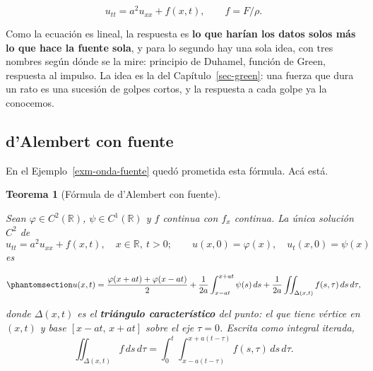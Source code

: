 \documentclass[
  spanish,
  a4paper,
]{scrbook}
\theoremstyle{definition}
\theoremstyle{plain}
\theoremstyle{definition}
\theoremstyle{plain}
\newtheorem{theorem}{Teorema}[chapter]
\theoremstyle{definition}
\theoremstyle{remark}
\begin{document}
\[
u_{tt} = a^2u_{xx} + f(x,t), \qquad f = F/\rho .
\]

Como la ecuación es lineal, la respuesta es \textbf{lo que harían los
datos solos más lo que hace la fuente sola}, y para lo segundo hay una
sola idea, con tres nombres según dónde se la mire: principio de
Duhamel, función de Green, respuesta al impulso. La idea es la del
Capítulo~\ref{sec-green}: una fuerza que dura un rato es una sucesión de
golpes cortos, y la respuesta a cada golpe ya la conocemos.

\subsection{d'Alembert con fuente}\label{sec-hip-duhamel}

En el Ejemplo~\ref{exm-onda-fuente} quedó prometida esta fórmula. Acá
está.

\begin{theorem}[Fórmula de d'Alembert con
fuente]\protect\hypertarget{thm-hip-dalembert-fuente}{}\label{thm-hip-dalembert-fuente}

Sean \(\varphi\in C^2(\mathbb R)\), \(\psi\in C^1(\mathbb R)\) y \(f\)
continua con \(f_x\) continua. La única solución \(C^2\) de
\[u_{tt} = a^2u_{xx} + f(x,t),\quad x\in\mathbb R,\ t>0;\qquad u(x,0)=\varphi(x),\quad u_t(x,0)=\psi(x)\]
es

\begin{equation}\protect\phantomsection\label{eq-hip-dalembert-fuente}{
u(x,t) = \frac{\varphi(x+at)+\varphi(x-at)}{2} + \frac{1}{2a}\int_{x-at}^{x+at}\psi(s)\,ds
+ \frac{1}{2a}\iint_{\Delta(x,t)} f(s,\tau)\,ds\,d\tau ,
}\end{equation}

donde \(\Delta(x,t)\) es el \textbf{triángulo característico} del punto:
el que tiene vértice en \((x,t)\) y base \([x-at,\,x+at]\) sobre el eje
\(\tau=0\). Escrita como integral iterada, \[
\iint_{\Delta(x,t)} f\,ds\,d\tau = \int_0^t\int_{x-a(t-\tau)}^{x+a(t-\tau)} f(s,\tau)\,ds\,d\tau .
\]

\end{theorem}
\end{document}
